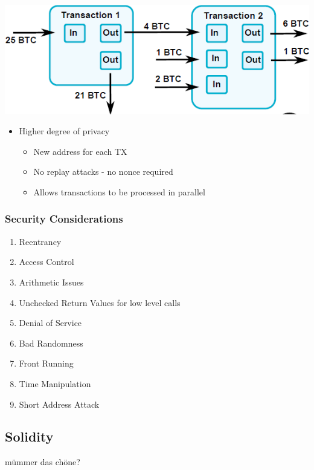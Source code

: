 \includegraphics[width=0.6\linewidth]{../img/utxo_based.png}
\begin{itemize}
    \item Higher degree of privacy
    \begin{itemize}
        \item New address for each TX
        \item No replay attacks - no nonce required
        \item Allows transactions to be processed in parallel
    \end{itemize}
\end{itemize}

\subsubsection{Security Considerations}
\begin{enumerate}
    \item Reentrancy
    \item Access Control
    \item Arithmetic Issues
    \item Unchecked Return Values for low level calls
    \item Denial of Service
    \item Bad Randomness
    \item Front Running
    \item Time Manipulation
    \item Short Address Attack
\end{enumerate}

\subsection{Solidity}
mümmer das chöne?